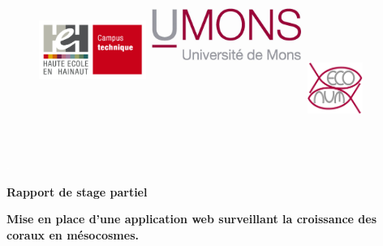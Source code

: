 \documentclass[]{report}
\title{}
\author{}
\date{}
\begin{document}
\begin{centering}

\begin{figure}

\includegraphics[width=3.5cm, height=6cm]{../image/technique-logo.jpg} 
\includegraphics[width=5cm,height=7cm]{../image/UMONS-logo.jpg}
\includegraphics[width=1.8cm,height=3.5cm]{../image/ECONUM-logo.pdf}

\end{figure}

\textcolor{white}{.}

\vspace{2.5 cm}

\Huge

{\bf Rapport de stage partiel}

\vspace{1 cm}

\huge 
{\bf Mise en place d'une application web surveillant la croissance des coraux en mésocosmes.}


\end{centering}
\end{document}

